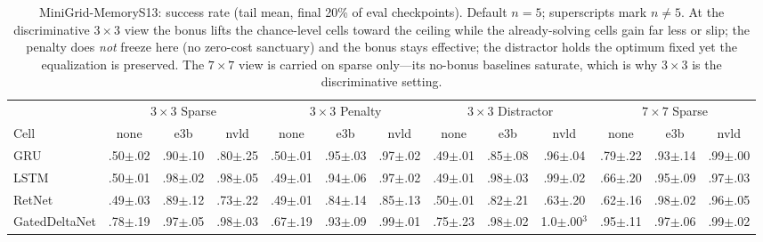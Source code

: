 \begin{table}[t]\centering
\caption{MiniGrid-MemoryS13: success rate (tail mean, final 20\% of eval checkpoints). Default $n{=}5$; superscripts mark $n{\neq}5$. At the discriminative $3\times3$ view the bonus lifts the chance-level cells toward the ceiling while the already-solving cells gain far less or slip; the penalty does \emph{not} freeze here (no zero-cost sanctuary) and the bonus stays effective; the distractor holds the optimum fixed yet the equalization is preserved. The $7\times7$ view is carried on sparse only---its no-bonus baselines saturate, which is why $3\times3$ is the discriminative setting.}
\label{tab:s13}\small\setlength{\tabcolsep}{4.5pt}
\begin{tabular}{@{}l ccc ccc ccc ccc@{}}\toprule
 & \multicolumn{3}{c}{$3\times3$ Sparse} & \multicolumn{3}{c}{$3\times3$ Penalty} & \multicolumn{3}{c}{$3\times3$ Distractor} & \multicolumn{3}{c}{$7\times7$ Sparse} \\
\cmidrule(lr){2-4}\cmidrule(lr){5-7}\cmidrule(lr){8-10}\cmidrule(lr){11-13}
Cell & none & e3b & nvld & none & e3b & nvld & none & e3b & nvld & none & e3b & nvld \\\midrule
GRU & .50{\scriptsize$\pm$.02} & .90{\scriptsize$\pm$.10} & .80{\scriptsize$\pm$.25} & .50{\scriptsize$\pm$.01} & .95{\scriptsize$\pm$.03} & .97{\scriptsize$\pm$.02} & .49{\scriptsize$\pm$.01} & .85{\scriptsize$\pm$.08} & .96{\scriptsize$\pm$.04} & .79{\scriptsize$\pm$.22} & .93{\scriptsize$\pm$.14} & .99{\scriptsize$\pm$.00} \\
LSTM & .50{\scriptsize$\pm$.01} & .98{\scriptsize$\pm$.02} & .98{\scriptsize$\pm$.05} & .49{\scriptsize$\pm$.01} & .94{\scriptsize$\pm$.06} & .97{\scriptsize$\pm$.02} & .49{\scriptsize$\pm$.01} & .98{\scriptsize$\pm$.03} & .99{\scriptsize$\pm$.02} & .66{\scriptsize$\pm$.20} & .95{\scriptsize$\pm$.09} & .97{\scriptsize$\pm$.03} \\
RetNet & .49{\scriptsize$\pm$.03} & .89{\scriptsize$\pm$.12} & .73{\scriptsize$\pm$.22} & .49{\scriptsize$\pm$.01} & .84{\scriptsize$\pm$.14} & .85{\scriptsize$\pm$.13} & .50{\scriptsize$\pm$.01} & .82{\scriptsize$\pm$.21} & .63{\scriptsize$\pm$.20} & .62{\scriptsize$\pm$.16} & .98{\scriptsize$\pm$.02} & .96{\scriptsize$\pm$.05} \\
GatedDeltaNet & .78{\scriptsize$\pm$.19} & .97{\scriptsize$\pm$.05} & .98{\scriptsize$\pm$.03} & .67{\scriptsize$\pm$.19} & .93{\scriptsize$\pm$.09} & .99{\scriptsize$\pm$.01} & .75{\scriptsize$\pm$.23} & .98{\scriptsize$\pm$.02} & 1.0{\scriptsize$\pm$.00}$^{3}$ & .95{\scriptsize$\pm$.11} & .97{\scriptsize$\pm$.06} & .99{\scriptsize$\pm$.02} \\

\end{tabular}
\end{table}
